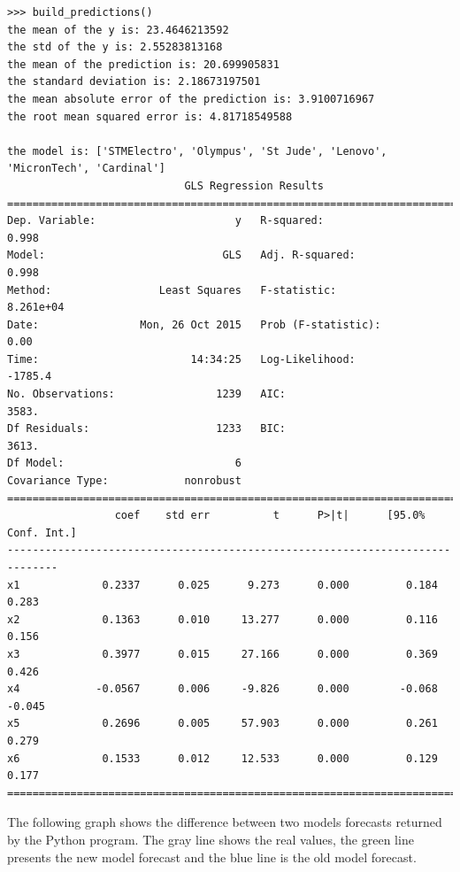 \documentclass [twoside,
  11pt, a4paper,
  footinclude=true,
  headinclude=true,
  cleardoublepage=empty
]{article}
\begin{document}
\begin{verbatim}
>>> build_predictions()
the mean of the y is: 23.4646213592
the std of the y is: 2.55283813168
the mean of the prediction is: 20.699905831
the standard deviation is: 2.18673197501
the mean absolute error of the prediction is: 3.9100716967
the root mean squared error is: 4.81718549588

the model is: ['STMElectro', 'Olympus', 'St Jude', 'Lenovo', 'MicronTech', 'Cardinal']
                            GLS Regression Results                            
==============================================================================
Dep. Variable:                      y   R-squared:                       0.998
Model:                            GLS   Adj. R-squared:                  0.998
Method:                 Least Squares   F-statistic:                 8.261e+04
Date:                Mon, 26 Oct 2015   Prob (F-statistic):               0.00
Time:                        14:34:25   Log-Likelihood:                -1785.4
No. Observations:                1239   AIC:                             3583.
Df Residuals:                    1233   BIC:                             3613.
Df Model:                           6                                         
Covariance Type:            nonrobust                                         
==============================================================================
                 coef    std err          t      P>|t|      [95.0% Conf. Int.]
------------------------------------------------------------------------------
x1             0.2337      0.025      9.273      0.000         0.184     0.283
x2             0.1363      0.010     13.277      0.000         0.116     0.156
x3             0.3977      0.015     27.166      0.000         0.369     0.426
x4            -0.0567      0.006     -9.826      0.000        -0.068    -0.045
x5             0.2696      0.005     57.903      0.000         0.261     0.279
x6             0.1533      0.012     12.533      0.000         0.129     0.177
==============================================================================
\end{verbatim}
The following graph shows the difference between two models forecasts returned by the Python program. The gray line shows the real values, the green line presents the new model forecast and the blue line is the old model forecast.\\
\end{document}
